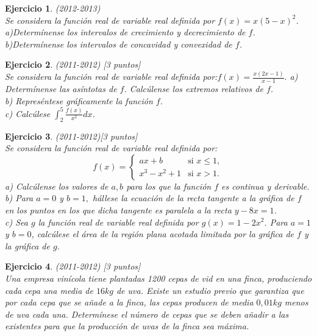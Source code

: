\documentclass[12pt, a4paper]{amsart}
\newtheorem{ejer}{Ejercicio}
\begin{document}
\begin{ejer}\em (2012-2013)\\
Se considera la función real de variable real definida por $f(x)=x(5-x)^2$.\\
a)Determínense los intervalos de crecimiento y decrecimiento de $f$.\\
b)Determínense los intervalos de concavidad y convexidad de $f$.
\end{ejer}

\begin{ejer}\em (2011-2012) [3 puntos]\\
Se considera la función real de variable real definida por:$f(x)=\frac{x(2x-1)}{x-1}.$
a) Determínense las asíntotas de $f$. Calcúlense los extremos relativos de $f$.\\
b) Represéntese gráficamente la función $f$.\\
c) Calcúlese $\int_2^5\frac{f(x)}{x^2}dx$.
\end{ejer}

\begin{ejer}\em (2011-2012)[3 puntos]\\
Se considera la función real de variable real definida por:
\begin{equation*}
f(x)=\left \{ \begin{matrix} ax+b & \mbox{si } x\leq 1,
\\ x^3-x^2+1 & \mbox{si } x > 1. \end{matrix}\right. 
\end{equation*}
a) Calcúlense los valores de $a,b$ para los que la función $f$ es continua y derivable.\\
b) Para $a=0$ y $b=1,$ hállese la ecuación de la recta tangente a la gráfica de $f$ en los puntos en los que dicha tangente es paralela a la recta $y-8x=1$.\\
c) Sea $g$ la función real de variable real definida por $g(x)=1-2x^2$. Para $a=1$ y $b=0$, calcúlese el área de la región plana acotada limitada por la gráfica de $f$ y la gráfica de  $g$.
\end{ejer}

\begin{ejer}\em (2011-2012) [3 puntos]\\
Una empresa vinícola tiene plantadas 1200 cepas de vid en una finca, produciendo cada cepa una media de $16kg$ de uva. Existe un estudio previo que garantiza que por cada cepa que se añade a la finca, las cepas producen de media $0,01kg$ menos de uva cada una. Determínese el número de cepas que se deben añadir a las existentes para que la producción de uvas de la finca sea máxima.
\end{ejer}
\end{document}
